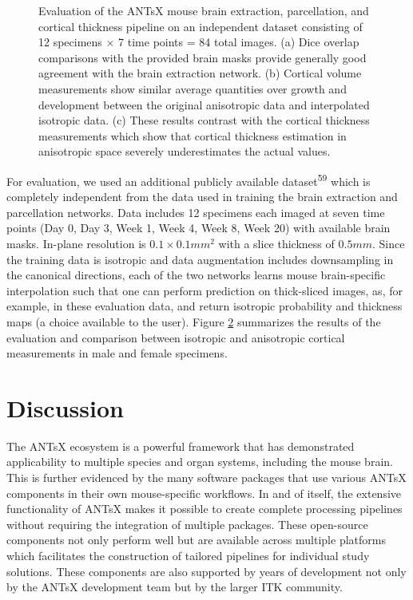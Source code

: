 \documentclass[
  12pt,
]{article}
\begin{document}
\begin{figure}
\begin{subfigure}{.5\textwidth}
  \caption{}
  \label{fig:subc}
\end{subfigure}
\caption{Evaluation of the ANTsX mouse brain extraction, parcellation, and
cortical thickness pipeline on an independent dataset 
consisting of 12 specimens $\times$ 7 time points = 
84 total images.  (a) Dice overlap comparisons with the provided brain
masks provide generally good agreement with the brain extraction network.
(b) Cortical volume measurements show similar average quantities over
growth and development between the original anisotropic data and 
interpolated isotropic data.  (c) These results contrast with the cortical
thickness measurements which show that cortical thickness estimation 
in anisotropic space severely underestimates the actual values.}
\label{fig:evaluation}
\end{figure}

For evaluation, we used an additional publicly available
dataset\textsuperscript{59} which is completely independent from the
data used in training the brain extraction and parcellation networks.
Data includes 12 specimens each imaged at seven time points (Day 0, Day
3, Week 1, Week 4, Week 8, Week 20) with available brain masks. In-plane
resolution is \(0.1 \times 0.1 mm^2\) with a slice thickness of
\(0.5 mm\). Since the training data is isotropic and data augmentation
includes downsampling in the canonical directions, each of the two
networks learns mouse brain-specific interpolation such that one can
perform prediction on thick-sliced images, as, for example, in these
evaluation data, and return isotropic probability and thickness maps (a
choice available to the user). Figure \ref{fig:evaluation} summarizes
the results of the evaluation and comparison between isotropic and
anisotropic cortical measurements in male and female specimens.

\clearpage
\newpage

\hypertarget{discussion}{%
\section{Discussion}\label{discussion}}

The ANTsX ecosystem is a powerful framework that has demonstrated
applicability to multiple species and organ systems, including the mouse
brain. This is further evidenced by the many software packages that use
various ANTsX components in their own mouse-specific workflows. In and
of itself, the extensive functionality of ANTsX makes it possible to
create complete processing pipelines without requiring the integration
of multiple packages. These open-source components not only perform well
but are available across multiple platforms which facilitates the
construction of tailored pipelines for individual study solutions. These
components are also supported by years of development not only by the
ANTsX development team but by the larger ITK community.
\end{document}
